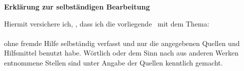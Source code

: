 \fancyhead{}
\fancyhf{}
\fancyhead[RO,LE]{\changefontbig\thepage}
\setlength{\parskip}{0pt}
\begin{center}

\textbf{\sffamily\large Erklärung zur selbständigen Bearbeitung}
\end{center}
\vspace{5mm}


Hiermit versichere ich, \Autor, dass ich die vorliegende
\Dokumentenart\ mit dem Thema:\\

\textbf{\Titel}\\

ohne fremde Hilfe selbständig verfasst und nur die
angegebenen Quellen und Hilfsmittel benutzt habe.
Wörtlich oder dem Sinn nach aus anderen Werken entnommene Stellen sind unter
Angabe der Quellen kenntlich gemacht.
\vspace{2cm}

\noindent\makebox[4cm]{\hrulefill} \hspace{0.1cm}
    \makebox[4cm]{\hrulefill} \hspace{0.1cm}
    \makebox[8cm]{\hrulefill} \\
\noindent{} \hspace{0.1cm}
     \hspace{0.1cm}


\clearpage
